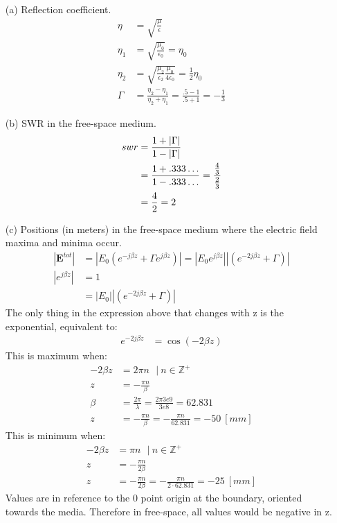 \documentclass[12pt]{article}
\begin{document}
\begin{itemize}
\item[(a)] Reflection coefficient.\\
  \begin{align*}
    \eta &= \sqrt{\frac{\mu}{\epsilon}}\\
    \eta_1 &= \sqrt{\frac{\mu_0}{\epsilon_0}} = \eta_0\\
    \eta_2 &= \sqrt{\frac{\mu_2}{\epsilon_2}\frac{\mu_0}{4\epsilon_0}} = \frac{1}{2}\eta_0\\
    \Gamma &= \frac{\eta_2-\eta_1}{\eta_2 + \eta_1} = \frac{.5 - 1}{.5 + 1} = -\frac{1}{3}
  \end{align*}
\item[(b)] SWR in the free-space medium.\\
  \begin{align*}
    swr &= \frac{1 + |\Gamma|}{1 - |\Gamma|}\\
        &= \frac{1 + .333\mathellipsis}{1 - .333\mathellipsis} = \frac{\frac{4}{3}}{\frac{2}{3}}\\
        &= \frac{4}{2} = 2
  \end{align*}
\item[(c)] Positions (in meters) in the free-space
medium where the electric field maxima
and minima occur.\\
\begin{align*}
  |\mathbf{E}^{tot}| &= |E_0 (e^{-j \beta z} + \Gamma e^{j \beta z})| = |E_0 e^{j \beta z}||(e^{-2j \beta z} + \Gamma)|\\
  |e^{j \beta z}| &= 1\\
  &= |E_0 ||(e^{-2j \beta z} + \Gamma)|
\end{align*}
The only thing in the expression above that changes with z is the exponential, equivalent to:
\begin{align*}
  e^{-2j\beta z} &= \cos{(-2\beta z)}
\end{align*}
This is maximum when:
\begin{align*}
  -2 \beta z &= 2 \pi n\ \ \ |\ n\in\mathbb{Z}^+\\
  z &= -\frac{\pi n}{\beta}\\
  \beta &= \frac{2\pi}{\lambda} = \frac{2\pi3e9}{3e8} = 62.831\\
  z &= -\frac{\pi n}{\beta} = -\frac{\pi n}{ 62.831} = - 50\ [mm]
\end{align*}
This is minimum when:
\begin{align*}
  -2 \beta z &= \pi n\ \ \ |\ n\in\mathbb{Z}^+\\
  z &= -\frac{\pi n}{2\beta} \\
  z &= -\frac{\pi n}{2\beta} = -\frac{\pi n}{2\cdot 62.831} = - 25\ [mm]
\end{align*}
Values are in reference to the 0 point origin at the boundary, oriented towards the media. Therefore in free-space, all values would be negative in z.


\end{itemize}
\end{document}
